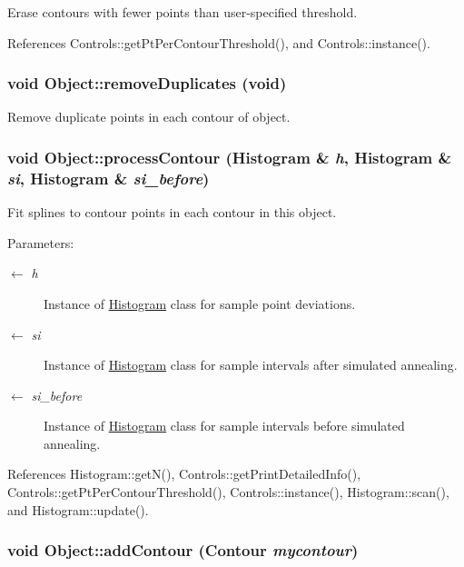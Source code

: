 Erase contours with fewer points than user-specified threshold. 

References Controls::getPtPerContourThreshold(), and Controls::instance().\hypertarget{classObject_3af0df50f0a3151df20fff62dcc1a891}{
\subsubsection[removeDuplicates]{\setlength{\rightskip}{0pt plus 5cm}void Object::removeDuplicates (void)}}
\label{classObject_3af0df50f0a3151df20fff62dcc1a891}


Remove duplicate points in each contour of object. \hypertarget{classObject_36ddffb901419facf6f32009a363405a}{
\subsubsection[processContour]{\setlength{\rightskip}{0pt plus 5cm}void Object::processContour ({\bf Histogram} \& {\em h}, \/  {\bf Histogram} \& {\em si}, \/  {\bf Histogram} \& {\em si\_\-before})}}
\label{classObject_36ddffb901419facf6f32009a363405a}


Fit splines to contour points in each contour in this object. \begin{Desc}
\item[Parameters:]
\begin{description}
\item[\mbox{$\leftarrow$} {\em h}]Instance of \hyperlink{classHistogram}{Histogram} class for sample point deviations. \item[\mbox{$\leftarrow$} {\em si}]Instance of \hyperlink{classHistogram}{Histogram} class for sample intervals after simulated annealing. \item[\mbox{$\leftarrow$} {\em si\_\-before}]Instance of \hyperlink{classHistogram}{Histogram} class for sample intervals before simulated annealing. \end{description}
\end{Desc}


References Histogram::getN(), Controls::getPrintDetailedInfo(), Controls::getPtPerContourThreshold(), Controls::instance(), Histogram::scan(), and Histogram::update().\hypertarget{classObject_0fbe7d79e1badad7bf63152cedb093bf}{
\subsubsection[addContour]{\setlength{\rightskip}{0pt plus 5cm}void Object::addContour ({\bf Contour} {\em mycontour})}}
\label{classObject_0fbe7d79e1badad7bf63152cedb093bf}


